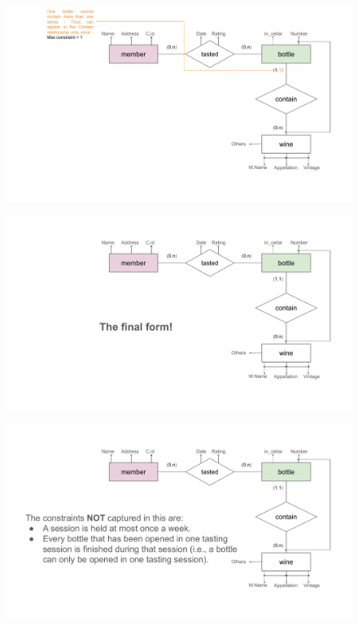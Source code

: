 \documentclass{beamer}
\begin{document}
\begin{frame}
    \begin{figure}
        \centering
        \includegraphics[width=1.1\linewidth]{tut_02_files/18.pdf}
    \end{figure}
\end{frame}

\begin{frame}
    \begin{figure}
        \centering
        \includegraphics[width=1.1\linewidth]{tut_02_files/19.pdf}
    \end{figure}
\end{frame}

\begin{frame}
    \begin{figure}
        \centering
        \includegraphics[width=1.1\linewidth]{tut_02_files/20.pdf}
    \end{figure}
\end{frame}
\end{document}
